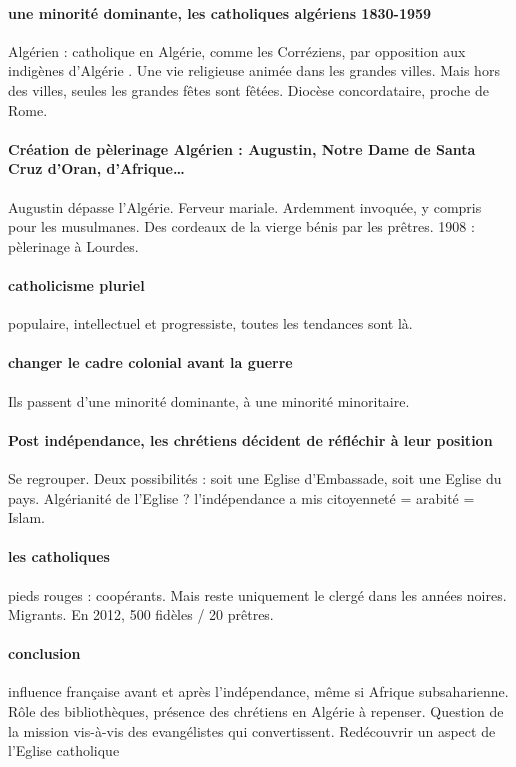 \paragraph{une minorité dominante, les catholiques algériens 1830-1959} Algérien : catholique en Algérie, comme les Corréziens, par opposition aux indigènes d’Algérie . 
Une vie religieuse animée dans les grandes villes. Mais hors des villes, seules les grandes fêtes sont fêtées. Diocèse concordataire, proche de Rome. 

\paragraph{Création de pèlerinage Algérien : Augustin, Notre Dame de Santa Cruz d’Oran, d’Afrique…} Augustin dépasse l’Algérie. Ferveur mariale. Ardemment invoquée, y compris pour les musulmanes. Des cordeaux de la vierge bénis par les prêtres. 1908 : pèlerinage à Lourdes. 
\paragraph{catholicisme pluriel} populaire, intellectuel et progressiste, toutes les tendances sont là. 

\paragraph{changer le cadre colonial avant la guerre}
Ils passent d’une minorité dominante, à une minorité minoritaire.

\paragraph{Post indépendance, les chrétiens décident de réfléchir à leur position} Se regrouper.  Deux possibilités : soit une Eglise d’Embassade, soit une Eglise du pays. Algérianité de l’Eglise ? l’indépendance a mis citoyenneté = arabité = Islam. 
\paragraph{les catholiques} pieds rouges : coopérants. Mais reste uniquement le clergé dans les années noires. Migrants. En 2012, 500 fidèles / 20 prêtres.   
\paragraph{conclusion} influence française avant et après l’indépendance, même si Afrique subsaharienne. Rôle des bibliothèques, présence des chrétiens en Algérie à repenser. Question de la mission vis-à-vis des evangélistes qui convertissent. Redécouvrir un aspect de l’Eglise catholique 


